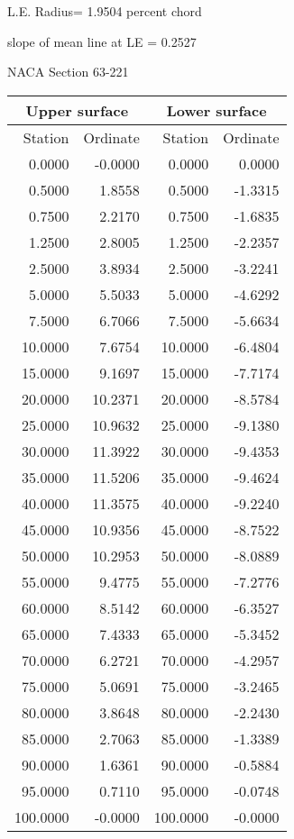 \documentclass[11pt]{book}
\begin{document}
L.E. Radius=  1.9504 percent chord


 slope of mean line at LE =  0.2527
 \newpage
  \label{s63-221}
 \begin{Large}
 NACA Section 63-221
 \end{Large}
  
 \vspace{8mm}
 \begin{tabular}{|r|r|r|r|} \hline 
 \multicolumn{2}{|c|}{Upper surface} & \multicolumn{2}{|c|}{Lower surface} \\
 \hline
 Station & Ordinate & Station & Ordinate \\
 \hline
0.0000 & -0.0000 & 0.0000 & 0.0000 \\
0.5000 & 1.8558 & 0.5000 & -1.3315 \\
0.7500 & 2.2170 & 0.7500 & -1.6835 \\
1.2500 & 2.8005 & 1.2500 & -2.2357 \\
2.5000 & 3.8934 & 2.5000 & -3.2241 \\
5.0000 & 5.5033 & 5.0000 & -4.6292 \\
7.5000 & 6.7066 & 7.5000 & -5.6634 \\
10.0000 & 7.6754 & 10.0000 & -6.4804 \\
15.0000 & 9.1697 & 15.0000 & -7.7174 \\
20.0000 & 10.2371 & 20.0000 & -8.5784 \\
25.0000 & 10.9632 & 25.0000 & -9.1380 \\
30.0000 & 11.3922 & 30.0000 & -9.4353 \\
35.0000 & 11.5206 & 35.0000 & -9.4624 \\
40.0000 & 11.3575 & 40.0000 & -9.2240 \\
45.0000 & 10.9356 & 45.0000 & -8.7522 \\
50.0000 & 10.2953 & 50.0000 & -8.0889 \\
55.0000 & 9.4775 & 55.0000 & -7.2776 \\
60.0000 & 8.5142 & 60.0000 & -6.3527 \\
65.0000 & 7.4333 & 65.0000 & -5.3452 \\
70.0000 & 6.2721 & 70.0000 & -4.2957 \\
75.0000 & 5.0691 & 75.0000 & -3.2465 \\
80.0000 & 3.8648 & 80.0000 & -2.2430 \\
85.0000 & 2.7063 & 85.0000 & -1.3389 \\
90.0000 & 1.6361 & 90.0000 & -0.5884 \\
95.0000 & 0.7110 & 95.0000 & -0.0748 \\
100.0000 & -0.0000 & 100.0000 & -0.0000 \\
 \hline 
 \end{tabular}
\end{document}
